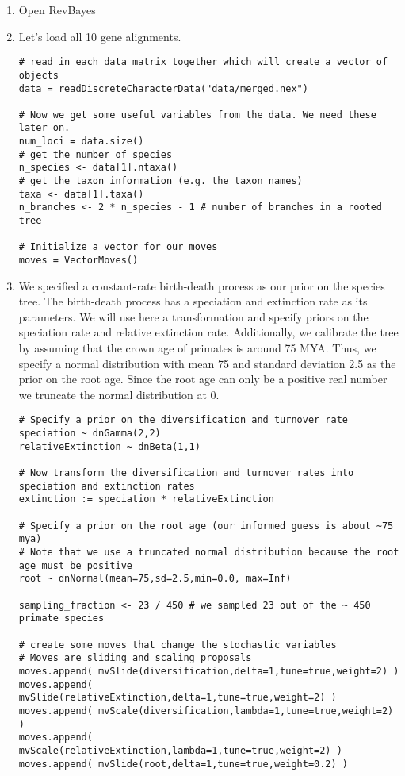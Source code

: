 \begin{enumerate}
\item Open RevBayes
\item Let's load all 10 gene alignments.
{\tt \begin{snugshade*}
\begin{lstlisting}
# read in each data matrix together which will create a vector of objects
data = readDiscreteCharacterData("data/merged.nex")

# Now we get some useful variables from the data. We need these later on.
num_loci = data.size()
# get the number of species
n_species <- data[1].ntaxa()
# get the taxon information (e.g. the taxon names)
taxa <- data[1].taxa()
n_branches <- 2 * n_species - 1 # number of branches in a rooted tree

# Initialize a vector for our moves
moves = VectorMoves()
\end{lstlisting}
\end{snugshade*}}
\item We specified a constant-rate birth-death process as our prior on the species tree. 
The birth-death process has a speciation and extinction rate as its parameters. 
We will use here a transformation and specify priors on the speciation rate and relative extinction rate.
Additionally, we calibrate the tree by assuming that the crown age of primates is around 75 MYA.
Thus, we specify a normal distribution with mean 75 and standard deviation 2.5 as the prior on the root age.
Since the root age can only be a positive real number we truncate the normal distribution at 0.
{\tt \begin{snugshade*}
\begin{lstlisting}
# Specify a prior on the diversification and turnover rate
speciation ~ dnGamma(2,2)
relativeExtinction ~ dnBeta(1,1)

# Now transform the diversification and turnover rates into speciation and extinction rates
extinction := speciation * relativeExtinction

# Specify a prior on the root age (our informed guess is about ~75 mya)
# Note that we use a truncated normal distribution because the root age must be positive
root ~ dnNormal(mean=75,sd=2.5,min=0.0, max=Inf)

sampling_fraction <- 23 / 450 # we sampled 23 out of the ~ 450 primate species

# create some moves that change the stochastic variables
# Moves are sliding and scaling proposals
moves.append( mvSlide(diversification,delta=1,tune=true,weight=2) )
moves.append( mvSlide(relativeExtinction,delta=1,tune=true,weight=2) )
moves.append( mvScale(diversification,lambda=1,tune=true,weight=2) )
moves.append( mvScale(relativeExtinction,lambda=1,tune=true,weight=2) )
moves.append( mvSlide(root,delta=1,tune=true,weight=0.2) )



\end{lstlisting}
\end{snugshade*}}
\end{enumerate}
